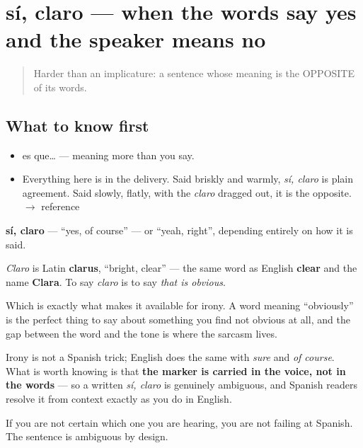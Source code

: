 \section[sí, claro]{sí, claro — when the words say yes and the speaker means no}

\label{lesson:ES-C272-si-claro}



\begin{quote}
Harder than an implicature: a sentence whose meaning is the OPPOSITE of its words.
\end{quote}

\subsection*{What to know first}
\begin{itemize}
\raggedright
  \item es que… — meaning more than you say.
\end{itemize}

\begin{sounds}
\begin{itemize}
\raggedright
  \item Everything here is in the delivery. Said briskly and warmly, \emph{sí, claro} is plain agreement. Said slowly, flatly, with the \emph{claro} dragged out, it is the opposite. $\to$ reference
\end{itemize}
\end{sounds}

\begin{cousinweb}
\textbf{sí, claro} — \textquotedblleft{}yes, of course\textquotedblright{} — or \textquotedblleft{}yeah, right\textquotedblright{}, depending entirely on how it is said.

\emph{Claro} is Latin \textbf{clarus}, \textquotedblleft{}bright, clear\textquotedblright{} — the same word as English \textbf{clear} and the name \textbf{Clara}. To say \emph{claro} is to say \emph{that is obvious}.

Which is exactly what makes it available for irony. A word meaning \textquotedblleft{}obviously\textquotedblright{} is the perfect thing to say about something you find not obvious at all, and the gap between the word and the tone is where the sarcasm lives.
\end{cousinweb}

\begin{grammarlens}[title={What you've built}]
Irony is not a Spanish trick; English does the same with \emph{sure} and \emph{of course}. What is worth knowing is that \textbf{the marker is carried in the voice, not in the words} — so a written \emph{sí, claro} is genuinely ambiguous, and Spanish readers resolve it from context exactly as you do in English.

If you are not certain which one you are hearing, you are not failing at Spanish. The sentence is ambiguous by design.
\end{grammarlens}


